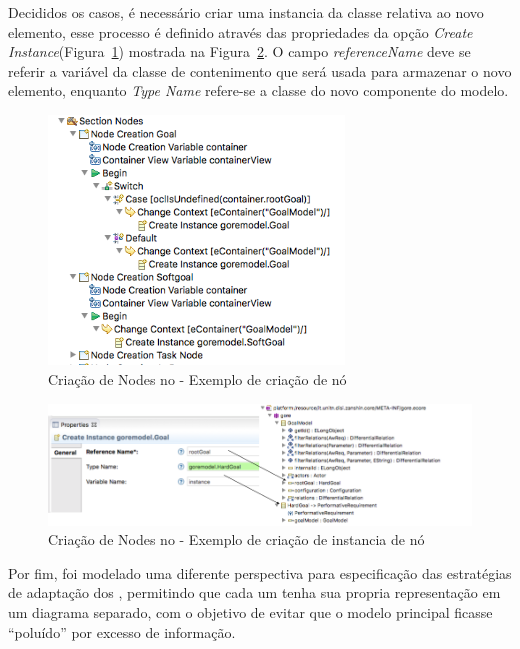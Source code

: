 Decididos os casos, é necessário criar uma instancia da classe relativa ao novo elemento, esse processo é definido através das propriedades da opção \textit{Create Instance}(Figura~\ref{figura-criacao-node}) mostrada na Figura~\ref{figura-propriedades-create-instance}. O campo \textit{referenceName} deve se referir a variável da classe de contenimento que será usada para armazenar o novo elemento, enquanto \textit{Type Name} refere-se a classe do novo componente do modelo.

\begin{figure}[h]
	\centering
	\includegraphics[width=0.7\textwidth]{figuras/unagi/exemplo-criacao-nodes.png}
	\caption{Criação de Nodes no \sirius - Exemplo de criação de nó}
	\label{figura-criacao-node}
\end{figure}

\begin{figure}[h]
	\centering
	\includegraphics[width=1\textwidth]{figuras/unagi/exemplo-propriedades-create-instance.png}
	\caption{Criação de Nodes no \sirius - Exemplo de criação de instancia de nó}
	\label{figura-propriedades-create-instance}
\end{figure}

Por fim, foi modelado uma diferente perspectiva para especificação das estratégias de adaptação dos \awreqs, permitindo que cada um tenha sua propria representação em um diagrama separado, com o objetivo de evitar que o modelo principal ficasse ``poluído'' por excesso de informação. 

